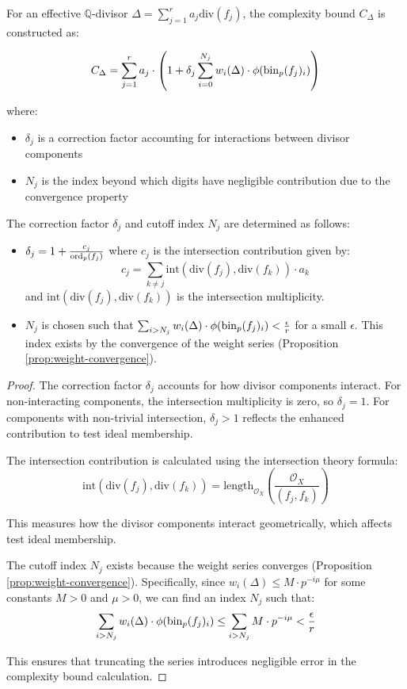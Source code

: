For an effective $\mathbb{Q}$-divisor $\Delta = \sum_{j=1}^{r} a_j \text{div}(f_j)$, the complexity bound $C_\Delta$ is constructed as:

$$C_\Delta = \sum_{j=1}^{r} a_j \cdot \left(1 + \delta_j \sum_{i=0}^{N_j} w_i(\Delta) \cdot \phi(\operatorname{bin}_p(f_j)_i) \right)$$

where:
\begin{itemize}
    \item $\delta_j$ is a correction factor accounting for interactions between divisor components
    \item $N_j$ is the index beyond which digits have negligible contribution due to the convergence property
\end{itemize}

\begin{proposition}\label{prop:correction-factors}
The correction factor $\delta_j$ and cutoff index $N_j$ are determined as follows:
\begin{itemize}
    \item $\delta_j = 1 + \frac{c_j}{\operatorname{ord}_p(f_j)}$ where $c_j$ is the intersection contribution given by:
    $$c_j = \sum_{k \neq j} \text{int}(\text{div}(f_j), \text{div}(f_k)) \cdot a_k$$
    and $\text{int}(\text{div}(f_j), \text{div}(f_k))$ is the intersection multiplicity.
    
    \item $N_j$ is chosen such that $\sum_{i > N_j} w_i(\Delta) \cdot \phi(\operatorname{bin}_p(f_j)_i) < \frac{\epsilon}{r}$ for a small $\epsilon$.
    This index exists by the convergence of the weight series (Proposition \ref{prop:weight-convergence}).
\end{itemize}
\end{proposition}

\begin{proof}
The correction factor $\delta_j$ accounts for how divisor components interact. For non-interacting components, the intersection multiplicity is zero, so $\delta_j = 1$. For components with non-trivial intersection, $\delta_j > 1$ reflects the enhanced contribution to test ideal membership.

The intersection contribution is calculated using the intersection theory formula:
$$\text{int}(\text{div}(f_j), \text{div}(f_k)) = \text{length}_{\mathcal{O}_X} \left( \frac{\mathcal{O}_X}{(f_j, f_k)} \right)$$

This measures how the divisor components interact geometrically, which affects test ideal membership.

The cutoff index $N_j$ exists because the weight series converges (Proposition \ref{prop:weight-convergence}). Specifically, since $w_i(\Delta) \leq M \cdot p^{-i\mu}$ for some constants $M > 0$ and $\mu > 0$, we can find an index $N_j$ such that:
$$\sum_{i > N_j} w_i(\Delta) \cdot \phi(\operatorname{bin}_p(f_j)_i) \leq \sum_{i > N_j} M \cdot p^{-i\mu} < \frac{\epsilon}{r}$$

This ensures that truncating the series introduces negligible error in the complexity bound calculation.
\end{proof}

